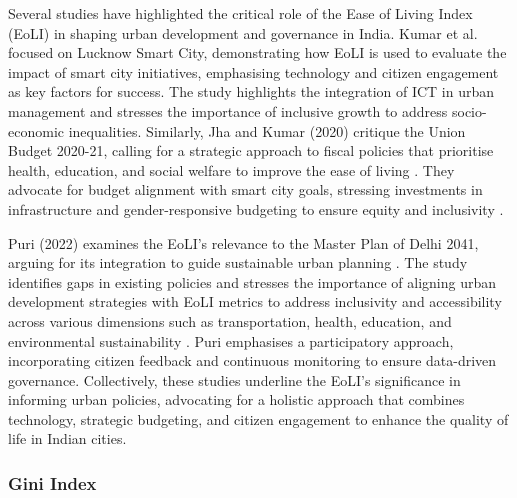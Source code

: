 



Several studies have highlighted the critical role of the Ease of Living Index (EoLI) in shaping urban development and governance in India. Kumar et al.  \cite{Kumar} focused on Lucknow Smart City, demonstrating how EoLI is used to evaluate the impact of smart city initiatives, emphasising technology and citizen engagement as key factors for success. The study highlights the integration of ICT in urban management\cite{Renukappa} and stresses the importance of inclusive growth to address socio-economic inequalities. Similarly, Jha and Kumar (2020) critique the Union Budget 2020-21, calling for a strategic approach to fiscal policies that prioritise health, education, and social welfare to improve the ease of living \cite{jha2020augmenting}. They advocate for budget alignment with smart city goals, stressing investments in infrastructure and gender-responsive budgeting to ensure equity and inclusivity \cite{Tandon}.

Puri (2022) examines the EoLI’s relevance to the Master Plan of Delhi 2041, arguing for its integration to guide sustainable urban planning \cite{Puri}. The study identifies gaps in existing policies and stresses the importance of aligning urban development strategies with EoLI metrics to address inclusivity and accessibility across various dimensions such as transportation, health, education, and environmental sustainability \cite{Puri}. Puri emphasises a participatory approach, incorporating citizen feedback and continuous monitoring to ensure data-driven governance. Collectively, these studies underline the EoLI’s significance in informing urban policies, advocating for a holistic approach that combines technology, strategic budgeting, and citizen engagement to enhance the quality of life in Indian cities.

\subsubsection{Gini Index}

